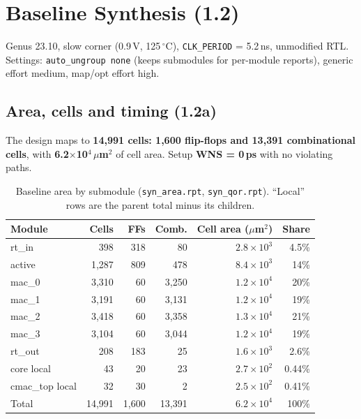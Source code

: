 
\section{Baseline Synthesis (1.2)}

Genus 23.10, slow corner (0.9\,V, 125\,$^\circ$C), \texttt{CLK\_PERIOD} = 5.2\,ns, unmodified RTL.
Settings: \texttt{auto\_ungroup none} (keeps submodules for per-module reports),
generic effort medium, map/opt effort high.

\subsection{Area, cells and timing (1.2a)}

The design maps to \textbf{14,991 cells: 1,600 flip-flops and 13,391 combinational cells},
with \textbf{6.2$\times$10$^4$\,$\mu$m$^2$} of cell area. Setup \textbf{WNS = 0\,ps} with no violating paths.

\begin{table}[H]
\centering
\small
\begin{tabular}{lrrrrr}
\toprule
Module & Cells & FFs & Comb. & Cell area ($\mu$m$^2$) & Share \\
\midrule
rt\_in          &   398 & 318 &    80 & $2.8\times10^3$ & 4.5\% \\
active          & 1,287 & 809 &   478 & $8.4\times10^3$ & 14\%  \\
mac\_0          & 3,310 &  60 & 3,250 & $1.2\times10^4$ & 20\%  \\
mac\_1          & 3,191 &  60 & 3,131 & $1.2\times10^4$ & 19\%  \\
mac\_2          & 3,418 &  60 & 3,358 & $1.3\times10^4$ & 21\%  \\
mac\_3          & 3,104 &  60 & 3,044 & $1.2\times10^4$ & 19\%  \\
rt\_out         &   208 & 183 &    25 & $1.6\times10^3$ & 2.6\% \\
core local      &    43 &  20 &    23 & $2.7\times10^2$ & 0.44\% \\
cmac\_top local &    32 &  30 &     2 & $2.5\times10^2$ & 0.41\% \\
\midrule
Total           & 14,991 & 1,600 & 13,391 & $6.2\times10^4$ & 100\% \\
\bottomrule
\end{tabular}
\caption{Baseline area by submodule (\texttt{syn\_area.rpt}, \texttt{syn\_qor.rpt}).
``Local'' rows are the parent total minus its children.}
\end{table}

